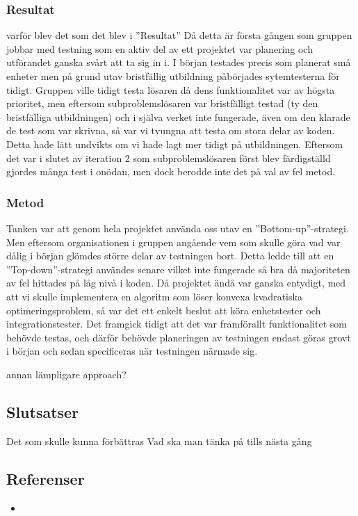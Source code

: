 	\subsubsection{Resultat}
	varför blev det som det blev i ''Resultat'' \newline
	Då detta är första gången som gruppen jobbar med testning som en aktiv del av ett projektet var planering och utförandet ganska svårt att ta sig in i. I början testades precis som planerat små enheter men på grund utav bristfällig utbildning påbörjades sytemtesterna för tidigt. Gruppen ville tidigt testa lösaren då dens funktionalitet var av högsta prioritet, men eftersom subproblemslösaren var bristfälligt testad (ty den bristfälliga utbildningen) och i själva verket inte fungerade, även om den klarade de test som var skrivna, så var vi tvungna att testa om stora delar av koden. Detta hade lätt undvikts om vi hade lagt mer tidigt på utbildningen. Eftersom det var i slutet av iteration 2 som subproblemslösaren först blev färdigställd gjordes många test i onödan, men dock berodde inte det på val av fel metod. 
	
	\subsubsection{Metod}
	Tanken var att genom hela projektet använda oss utav en ''Bottom-up''-strategi. Men eftersom organisationen i gruppen angående vem som skulle göra vad var dålig i början glömdes större delar av testningen bort. Detta ledde till att en ''Top-down''-strategi användes senare vilket inte fungerade så bra då majoriteten av fel hittades på låg nivå i koden.
	Då projektet ändå var ganska entydigt, med att vi skulle implementera en algoritm som löser konvexa kvadratiska optimeringsproblem, så var det ett enkelt beslut att köra enhetstester och integrationstester. Det framgick tidigt att det var framförallt funktionalitet som behövde testas, och därför behövde planeringen av testningen endast göras grovt i början och sedan specificeras när testningen närmade sig.

	annan lämpligare approach?	
	
	\subsection{Slutsatser}
	Det som skulle kunna förbättras 
	Vad ska man tänka på tills nästa gång
	
	\subsection{Referenser}
	\begin{itemize}
	\item{}
	\end{itemize}
	
